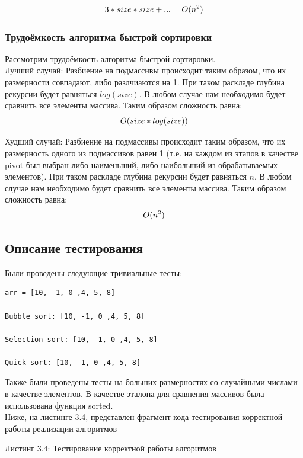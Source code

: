 \documentclass[12pt,a4paper]{article}
\numberwithin{equation}{section}
\begin{document}
\begin{equation}
	3*size*size + ... = O(n^2)\\
\end{equation}


\subsubsection{Трудоёмкость алгоритма быстрой сортировки}
\qquad Рассмотрим трудоёмкость алгоритма быстрой сортировки.\\
Лучший случай: Разбиение на подмассивы происходит таким образом, что их размерности совпадают, либо разлчиаются на 1. При таком раскладе глубина рекурсии будет равняться $log(size)$. В любом случае нам необходимо будет сравнить все элементы массива. Таким образом сложность равна:\\
\begin{equation}
	O(size * log(size))\\
\end{equation}


\qquad Худший случай: Разбиение на подмассивы происходит таким образом, что их размерность одного из подмассивов равен 1 (т.е. на каждом из этапов в качестве pivot был выбран либо наименьший, либо наибольший из обрабатываемых элементов). При таком раскладе глубина рекурсии будет равняться $n$. В любом случае нам необходимо будет сравнить все элементы массива. Таким образом сложность равна:\\
\begin{equation}
O(n^2)\\
\end{equation}




\subsection{Описание тестирования} %
Были проведены следующие тривиальные тесты:\\
\begin{lstlisting}
arr = [10, -1, 0 ,4, 5, 8]

Bubble sort: [10, -1, 0 ,4, 5, 8]

Selection sort: [10, -1, 0 ,4, 5, 8]

Quick sort: [10, -1, 0 ,4, 5, 8]

\end{lstlisting}

\qquad Также были проведены тесты на больших размерностях со случайными числами в качестве элементов. В качестве эталона для сравнения массивов была использована функция sorted.\\
\qquad Ниже, на листинге 3.4, представлен фрагмент кода тестирования корректной работы реализации алгоритмов
\begin{center}
	Листинг 3.4: Тестирование корректной работы алгоритмов
		
\end{center}
\end{document}
